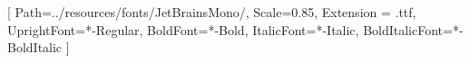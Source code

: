 

\usepackage{xcolor, cancel}
%

\usepackage{fontspec}
\usepackage[T1]{fontenc}  %
\usepackage{titlesec}  %

	\setmainfont{Helvetica}  %
	\setsansfont{Helvetica}  %

	\setmonofont{JetBrains Mono}[
		Path=../resources/fonts/JetBrainsMono/,
		Scale=0.85,
		Extension = .ttf,
		UprightFont=*-Regular,
		BoldFont=*-Bold,
		ItalicFont=*-Italic,
		BoldItalicFont=*-BoldItalic
	]

\usepackage{etoolbox}
	\AtBeginDocument{\color{darkgray}}

	\titleformat{\section}{\normalfont\sffamily\Large\bfseries\color{black}}{\thesection}{1em}{}
	\titleformat{\subsection}{\normalfont\sffamily\large\bfseries\color{black}}{\thesubsection}{1em}{}
	\titleformat{\subsubsection}{\normalfont\sffamily\normalsize\bfseries\color{black}}{\thesubsubsection}{1em}{}

	\makeatletter
	\renewcommand{\maketitle}{
		\begin{center}
		{\sffamily\LARGE\bfseries\@title\par}
			\vskip 1em
				{\large \@author}
			\vskip 1em
				{\@date}
		\end{center}
	}
	\makeatother

